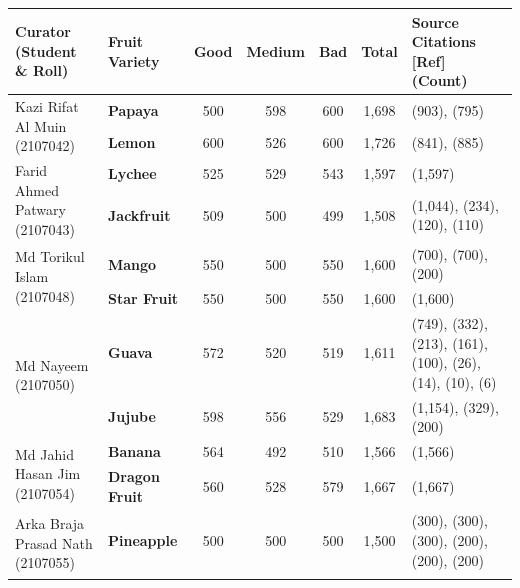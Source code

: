 \documentclass[11pt,a4paper]{article}
\begin{document}
\begin{table}[H]
\centering\small
\begin{tabularx}{\textwidth}{|p{}|p{}|c|c|c|c|X|}
\hline
\textbf{Curator (Student \& Roll)} & \textbf{Fruit Variety} & \textbf{Good} & \textbf{Medium} & \textbf{Bad} & \textbf{Total} & \textbf{Source Citations [Ref] (Count)} \\
\hline
\multirow{2}{=}{Kazi Rifat Al Muin (2107042)} & \textbf{Papaya} & 500 & 598 & 600 & 1,698 & \cite{papaya_roboflow_2} (903), \cite{papaya_mendeley} (795) \\ \cline{2-7}
 & \textbf{Lemon} & 600 & 526 & 600 & 1,726 & \cite{lemon_kaggle} (841), \cite{lemon_mendeley} (885) \\ \hline
\multirow{2}{=}{Farid Ahmed Patwary (2107043)} & \textbf{Lychee} & 525 & 529 & 543 & 1,597 & \cite{ref_lychee_ladd} (1,597) \\ \cline{2-7}
 & \textbf{Jackfruit} & 509 & 500 & 499 & 1,508 & \cite{ref_jackfruit_trai_mit} (1,044), \cite{ref_jackfruit_disease} (234), \cite{ref_jackfruit_healthy} (120), \cite{ref_jackfruit_shape} (110) \\ \hline
\multirow{2}{=}{Md Torikul Islam (2107048)} & \textbf{Mango} & 550 & 500 & 550 & 1,600 & \cite{ref_mango_3} (700), \cite{ref_mango_2} (700), \cite{ref_mango_1} (200) \\ \cline{2-7}
 & \textbf{Star Fruit} & 550 & 500 & 550 & 1,600 & \cite{ref_star_1} (1,600) \\ \hline
\multirow{2}{=}{Md Nayeem (2107050)} & \textbf{Guava} & 572 & 520 & 519 & 1,611 & \cite{ref_guava_3} (749), \cite{ref_guava_7} (332), \cite{ref_guava_1} (213), \cite{ref_guava_5} (161), \cite{ref_guava_2} (100), \cite{ref_guava_9} (26), \cite{ref_guava_11} (14), \cite{ref_guava_6} (10), \cite{ref_guava_8} (6) \\ \cline{2-7}
 & \textbf{Jujube} & 598 & 556 & 529 & 1,683 & \cite{ref_jujube_1} (1,154), \cite{ref_jujube_3} (329), \cite{ref_jujube_2} (200) \\ \hline
\multirow{2}{=}{Md Jahid Hasan Jim (2107054)} & \textbf{Banana} & 564 & 492 & 510 & 1,566 & \cite{ref_banana_qual} (1,566) \\ \cline{2-7}
 & \textbf{Dragon Fruit} & 560 & 528 & 579 & 1,667 & \cite{ref_dragonfruit} (1,667) \\ \hline
\multirow{2}{=}{Arka Braja Prasad Nath (2107055)} & \textbf{Pineapple} & 500 & 500 & 500 & 1,500 & \cite{ref_pineapple_1} (300), \cite{ref_pineapple_2} (300), \cite{ref_pineapple_3} (300), \cite{ref_pineapple_4} (200), \cite{ref_pineapple_5} (200), \cite{ref_pineapple_6} (200) \\ \cline{2-7}

\end{tabularx}
\end{table}
\end{document}
